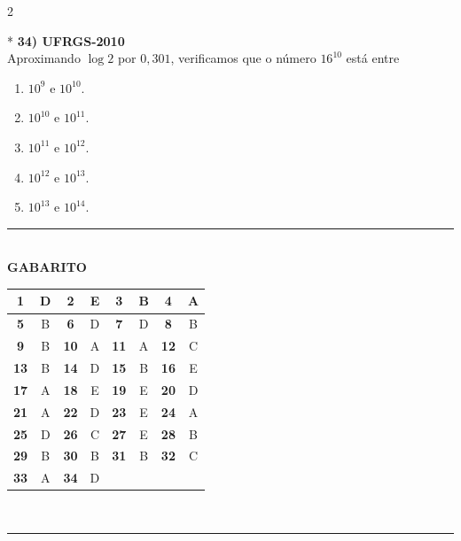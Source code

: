 \documentclass[11pt,a4paper]{article}
\begin{document}
\begin{paracol}{2}
\switchcolumn[1]
\vspace{16cm}

\switchcolumn[0]*
\textbf{34) UFRGS-2010} \\
Aproximando $\log 2$ por $0{,}301$, verificamos que o número $16^{10}$ está entre

\begin{enumerate}[label=(\Alph*)]
    \item $10^9 \text{ e } 10^{10}$.
    \item $10^{10} \text{ e } 10^{11}$.
    \item $10^{11} \text{ e } 10^{12}$.
    \item $10^{12} \text{ e } 10^{13}$.
    \item $10^{13} \text{ e } 10^{14}$.
\end{enumerate}
\vspace{0.4cm}

\switchcolumn[1]
\vspace{6cm}

\end{paracol}

\newpage
\begin{center}
    \rule{0.6\textwidth}{0.5pt} \\[0.3cm]
    \textbf{\large GABARITO} \\[0.3cm]
    \begin{tabular}{|c|c|c|c|c|c|c|c|}
        \hline
        \textbf{1} & D & \textbf{2} & E & \textbf{3} & B & \textbf{4} & A \\ \hline
        \textbf{5} & B & \textbf{6} & D & \textbf{7} & D & \textbf{8} & B \\ \hline
        \textbf{9} & B & \textbf{10} & A & \textbf{11} & A & \textbf{12} & C \\ \hline
        \textbf{13} & B & \textbf{14} & D & \textbf{15} & B & \textbf{16} & E \\ \hline
        \textbf{17} & A & \textbf{18} & E & \textbf{19} & E & \textbf{20} & D \\ \hline
        \textbf{21} & A & \textbf{22} & D & \textbf{23} & E & \textbf{24} & A \\ \hline
        \textbf{25} & D & \textbf{26} & C & \textbf{27} & E & \textbf{28} & B \\ \hline
        \textbf{29} & B & \textbf{30} & B & \textbf{31} & B & \textbf{32} & C \\ \hline
        \textbf{33} & A & \textbf{34} & D & \multicolumn{4}{c|}{} \\ \hline
    \end{tabular} \\[0.3cm]
    \rule{0.6\textwidth}{0.5pt}
\end{center}
\end{document}
